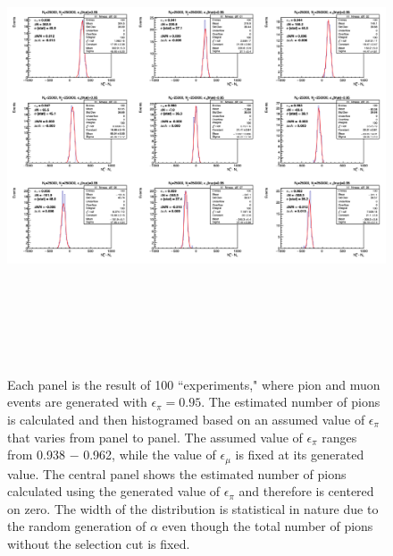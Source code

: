 \documentclass[12pt]{article}
\begin{document}
\begin{landscape}
\begin{figure}[tbph]
\begin{center}
\includegraphics[height=14cm,clip=true]{cpp_systematics_lpi025_lmu005_c2}
\caption{Each panel is the result of 100 ``experiments," where pion and muon events are generated with $\epsilon_\pi=0.95$. The estimated number of pions is calculated and then histogramed based on an assumed value of $\epsilon_\pi$ that varies from panel to panel. The assumed value of $\epsilon_\pi$ ranges from 0.938 $-$ 0.962, while the value of  $\epsilon_\mu$ is fixed at its generated value. The central panel shows the estimated number of pions calculated using the generated value of $\epsilon_\pi$ and therefore is centered on zero.
The width of the distribution is statistical in nature due to the random generation of $\alpha$ even though the total number of pions without the selection cut is fixed. 
\label{fig:cpp_systematics_lpi025_lmu005_c2}}
\end{center}
\end{figure} 
\end{landscape}
\end{document}

